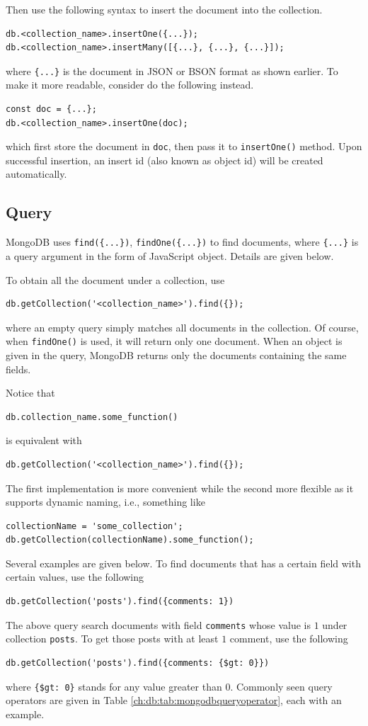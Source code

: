 Then use the following syntax to insert the document into the collection.
\begin{lstlisting}
db.<collection_name>.insertOne({...});
db.<collection_name>.insertMany([{...}, {...}, {...}]);
\end{lstlisting}
where \verb|{...}| is the document in JSON or BSON format as shown earlier. To make it more readable, consider do the following instead.
\begin{lstlisting}
const doc = {...};
db.<collection_name>.insertOne(doc);
\end{lstlisting}
which first store the document in \verb|doc|, then pass it to \verb|insertOne()| method. Upon successful insertion, an insert id (also known as object id) will be created automatically.

\subsection{Query}

MongoDB uses \verb|find({...})|, \verb|findOne({...})| to find documents, where \verb|{...}| is a query argument in the form of JavaScript object. Details are given below.

To obtain all the document under a collection, use
\begin{lstlisting}
db.getCollection('<collection_name>').find({});
\end{lstlisting}
where an empty query simply matches all documents in the collection. Of course, when \verb|findOne()| is used, it will return only one document. When an object is given in the query, MongoDB returns only the documents containing the same fields.

Notice that
\begin{lstlisting}
db.collection_name.some_function()
\end{lstlisting}
is equivalent with
\begin{lstlisting}
db.getCollection('<collection_name>').find({});
\end{lstlisting}
The first implementation is more convenient while the second more flexible as it supports dynamic naming, i.e., something like
\begin{lstlisting}
collectionName = 'some_collection';
db.getCollection(collectionName).some_function();
\end{lstlisting}

Several examples are given below. To find documents that has a certain field with certain values, use the following
\begin{lstlisting}
db.getCollection('posts').find({comments: 1})
\end{lstlisting}
The above query search documents with field \verb|comments| whose value is $1$ under collection \verb|posts|. To get those posts with at least $1$ comment, use the following
\begin{lstlisting}
db.getCollection('posts').find({comments: {$gt: 0}})
\end{lstlisting}
where \verb|{$gt: 0}| stands for any value greater than $0$. Commonly seen query operators are given in Table \ref{ch:db:tab:mongodbqueryoperator}, each with an example.

